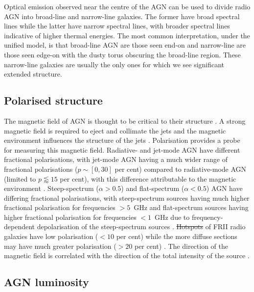 \documentclass[11pt, a4paper]{book}
\providecommand{\DIFaddtex}[1]{{\protect\color{blue}\uwave{#1}}} %
\providecommand{\DIFdeltex}[1]{{\protect\color{red}\sout{#1}}}                      %
\providecommand{\DIFaddbegin}{} %
\providecommand{\DIFaddend}{} %
\providecommand{\DIFdelbegin}{} %
\providecommand{\DIFdelend}{} %
\providecommand{\DIFadd}[1]{\texorpdfstring{\DIFaddtex{#1}}{#1}} %
\providecommand{\DIFdel}[1]{\texorpdfstring{\DIFdeltex{#1}}{}} %
\newcommand{\DIFscaledelfig}{0.5}
\newlength{\DIFdelgraphicswidth} %
\newlength{\DIFdelgraphicsheight} %
\newcommand{\DIFaddincludegraphics}[2][]{{\color{blue}\fbox{\DIFOincludegraphics[#1]{#2}}}} %
\newcommand{\DIFdelincludegraphics}[2][]{%
\sbox{\DIFdelgraphicsbox}{\DIFOincludegraphics[#1]{#2}}%
\settoboxwidth{\DIFdelgraphicswidth}{\DIFdelgraphicsbox} %
\settoboxtotalheight{\DIFdelgraphicsheight}{\DIFdelgraphicsbox} %
\scalebox{\DIFscaledelfig}{%
\parbox[b]{\DIFdelgraphicswidth}{\usebox{\DIFdelgraphicsbox}\\[-\baselineskip] \rule{\DIFdelgraphicswidth}{0em}}\llap{\resizebox{\DIFdelgraphicswidth}{\DIFdelgraphicsheight}{%
\setlength{\unitlength}{\DIFdelgraphicswidth}%
\begin{picture}(1,1)%
\thicklines\linethickness{2pt} %
{\color[rgb]{1,0,0}\put(0,0){\framebox(1,1){}}}%
{\color[rgb]{1,0,0}\put(0,0){\line( 1,1){1}}}%
{\color[rgb]{1,0,0}\put(0,1){\line(1,-1){1}}}%
\end{picture}%
}\hspace*{3pt}}} %
} %
\DeclareRobustCommand{\DIFaddbegin}{\DIFOaddbegin \let\includegraphics\DIFaddincludegraphics} %
\DeclareRobustCommand{\DIFaddend}{\DIFOaddend \let\includegraphics\DIFOincludegraphics} %
\DeclareRobustCommand{\DIFdelbegin}{\DIFOdelbegin \let\includegraphics\DIFdelincludegraphics} %
\DeclareRobustCommand{\DIFdelend}{\DIFOaddend \let\includegraphics\DIFOincludegraphics} %
\begin{document}
        Optical emission observed near the centre of the AGN can be used to divide radio AGN into broad-line and narrow-line galaxies. The former have broad spectral lines while the latter have narrow spectral lines, with broader spectral lines indicative of higher thermal energies. The most common interpretation, under the unified model, is that broad-line AGN are those seen end-on and narrow-line are those seen edge-on with the dusty torus obscuring the broad-line region. These narrow-line galaxies are usually the only ones for which we see significant extended structure.

    \subsection{Polarised structure}
    \label{sec:polarised-structure-of-agn}

        The magnetic field of AGN is thought to be critical to their structure \citep{sikora_magnetic_2013}. A strong magnetic field is required to eject and collimate the jets \citep{lovelace_dynamo_1976} and the magnetic environment influences the structure of the jets \citep{osullivan_magnetic_2015}. Polarisation provides a probe for measuring this magnetic field. Radiative- and jet-mode AGN have different fractional polarisations, with jet-mode AGN having a much wider range of fractional polarisations ($p \sim [0, 30]$ per cent) compared to radiative-mode AGN (limited to $p \lessapprox 15$ per cent), with this difference attributable to the magnetic environment \citep{osullivan_magnetic_2015}. Steep-spectrum ($\alpha > 0.5$) and flat-spectrum ($\alpha < 0.5$) AGN have differing fractional polarisations, with steep-spectrum sources having much higher fractional polarisation for frequencies $> 5$~GHz and flat-spectrum sources having higher fractional polarisation for frequencies $< 1$~GHz due to frequency-dependent depolarisation of the steep-spectrum sources \citep{saikia_polarization_1988}. \DIFdelbegin \DIFdel{Hotspots }\DIFdelend \DIFaddbegin \DIFadd{Hot-spots }\DIFaddend of FRII radio galaxies have low polarisation ($<10$ per cent) while the more diffuse sections may have much greater polarisation ($>20$ per cent) \citep{saikia_polarization_1988}. The direction of the magnetic field is correlated with the direction of \DIFaddbegin \DIFadd{patterns in }\DIFaddend the total intensity of the source \citep{saikia_polarization_1988}.

    \subsection{AGN luminosity}
    \label{sec:agn-throughout}
\end{document}
